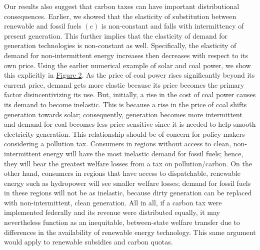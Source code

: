 \documentclass[11pt,a4paper]{extarticle}
\begin{document}
Our results also suggest that carbon taxes can have important distributional consequences. Earlier, we showed that the elasticity of substitution between renewable and fossil fuels $(e)$ is non-constant and falls with intermittency of present generation. This further implies that the elasticity of demand for generation technologies is non-constant as well. Specifically, the elasticity of demand for non-intermittent energy increases then decreases with respect to its own price. Using the earlier numerical example of solar and coal power, we show this explicitly in \hyperref[fig:coalelas]{Figure 2}. As the price of coal power rises significantly beyond its current price, demand gets more elastic because its price becomes the primary factor disincentivizing its use. But, initially, a rise in the cost of coal power causes its demand to become inelastic. This is because a rise in the price of coal shifts generation towards solar;  consequently, generation becomes more intermittent and demand for coal becomes less price sensitive since it is needed to help smooth electricity generation. This relationship should be of concern for policy makers considering a pollution tax. Consumers in regions without access to clean, non-intermittent energy will have the most inelastic demand for fossil fuels; hence, they will bear the greatest welfare losses from a tax on pollution/carbon. On the other hand, consumers in regions that have access to dispatchable, renewable energy such as hydropower will see smaller welfare losses; demand for fossil fuels in these regions will not be as inelastic, because dirty generation can be replaced with non-intermittent, clean generation. All in all, if a carbon tax were implemented federally and its revenue were distributed equally, it may nevertheless function as an inequitable, between-state welfare transfer due to differences in the availability of renewable energy technology. This same argument would apply  to renewable subsidies and carbon quotas.
\end{document}

